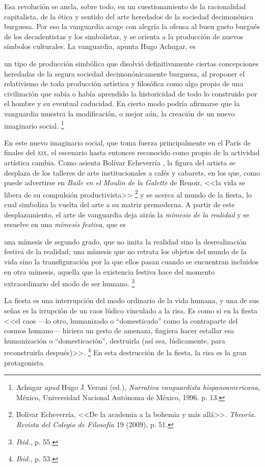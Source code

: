 \documentclass[14pt,twoside,final]{extbook} %
\let\oldfootnote\footnote
\renewcommand\footnote[1]{%
\oldfootnote{\hspace{1mm}#1}}
\begin{document}
Esa revolución se ancla, sobre todo, en un cuestionamiento de la racionalidad capitalista, de la ética y sentido del arte heredados de la sociedad decimonónica burguesa. Por eso la vanguardia acoge con alegría la ofensa al buen gusto burgués de los decadentistas y los simbolistas, y se orienta a la producción de nuevos símbolos culturales. La vanguardia, apunta Hugo Achugar, es
\begin{quoting}
un tipo de producción simbólica que disolvió definitivamente ciertas concepciones heredadas de la segura sociedad decimonónicamente burguesa, al proponer el relativismo de toda producción artística y filosófica como algo propio de una civilización que sabía o había aprendido la historicidad de todo lo construido por el hombre y su eventual caducidad. En cierto modo podría afirmarse que la vanguardia muestra la modificación, o mejor aún, la creación de un nuevo imaginario social.\footnote{Achugar \emph{apud} Hugo J.\,Verani (ed.), \emph{Narrativa vanguardista hispanoamericana}, México, Universidad Nacional Autónoma de México, 1996. p. 13.}
\end{quoting}
En este nuevo imaginario social, que toma fuerza principalmente en el París de finales del \textsc{xix}, el escenario hasta entonces reconocido como propio de la actividad artística cambia. Como asienta Bolívar Echeverría , la figura del artista se desplaza de los talleres de arte institucionales a cafés y cabarets, en los que, como puede advertirse en \emph{Baile en el Moulin de la Galette} de Renoir, <<la vida se libera de su compulsión productivista>>\footnote{Bolívar Echeverría, <<De la academia a la bohemia y más allá>>. \emph{Theoría. Revista del Colegio de Filosofía} 19 (2009), p. 51.} y se acerca al mundo de la fiesta, lo cual simboliza la vuelta del arte a su matriz premoderna. A partir de este desplazamiento, el arte de vanguardia deja atrás la \emph{mímesis de la realidad} y se resuelve en una \emph{mímesis festiva}, que es
\begin{quoting}
una mímesis de segundo grado, que no imita la realidad sino la desrealización festiva de la realidad; una mímesis que no retrata los objetos del mundo de la vida sino la transfiguración por la que ellos pasan cuando se encuentran incluidos en otra mímesis, aquella que la existencia festiva hace del momento extraordinario del modo de ser humano.\footnote{\emph{Ibid.}, p. 55.}
\end{quoting}
La fiesta es una interrupción del modo ordinario de la vida humana, y una de sus señas es la irrupción de un caos lúdico vinculado a la risa. Es como si en la fiesta <<el caos ---lo otro, humanizado o ``domesticado'' como la contraparte del cosmos humano--- hiciera un gesto de amenaza, fingiera hacer estallar esa humanización o ``domesticación'', destruirla (así sea, lúdicamente, para reconstruirla después)>>.\footnote{\emph{Ibid.}, p. 53.} En esta destrucción de la fiesta, la risa es la gran protagonista.
\end{document}
